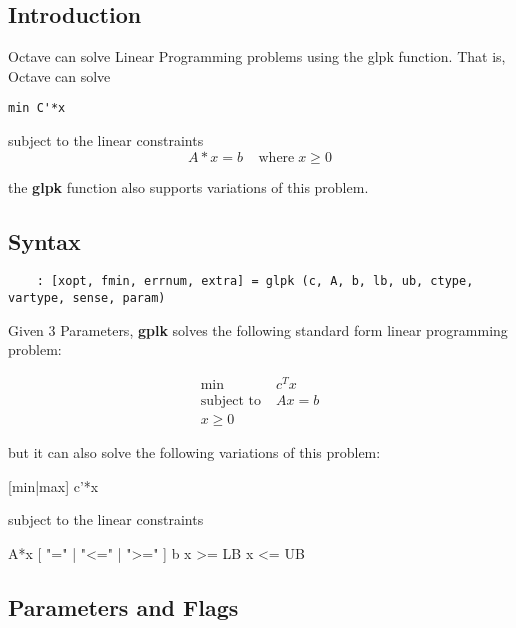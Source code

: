 \subsection{Introduction}
Octave can solve Linear Programming problems using the glpk function. That is, Octave can solve

\newenvironment{centerverbatim}{%
  \par
  \centering
  \varwidth{\linewidth}%
  \verbatim
}{%
  \endverbatim
  \endvarwidth
  \par
}

\begin{verbatim}
min C'*x
\end{verbatim}

subject to the linear constraints
\begin{equation}
A*x = b \;\;\;\; \text{where} \; x \geq 0
\end{equation}

the \textbf{glpk} function also supports variations of this problem.

\subsection{Syntax}
\begin{verbatim}
    : [xopt, fmin, errnum, extra] = glpk (c, A, b, lb, ub, ctype, vartype, sense, param)
\end{verbatim}

Given 3 Parameters, \textbf{gplk} solves the following standard form linear programming problem:

\begin{equation}
\begin{aligned}
\min & \; c^T x \\
\text{subject to} & \; A x = b \\
x \geq 0
\end{aligned}
\end{equation}

but it can also solve the following variations of this problem:

\begin{centerverbatim}
[min|max] c'*x
\end{centerverbatim}

subject to the linear constraints
\begin{centerverbatim}
    A*x [ "=" | "<=" | ">=" ] b
    x >= LB
    x <= UB
\end{centerverbatim}

\subsection{Parameters and Flags}
 
